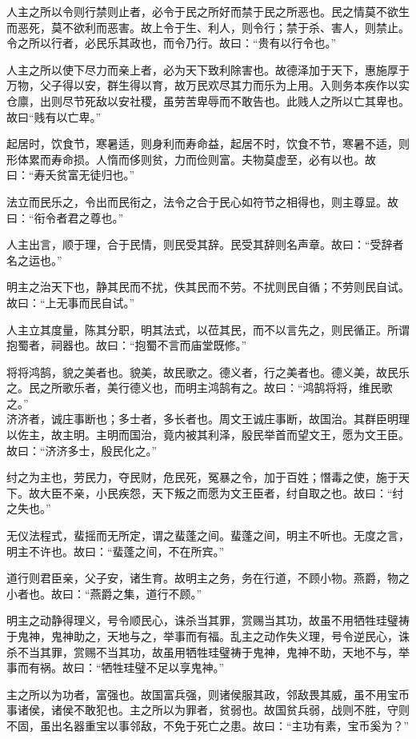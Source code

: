 \documentclass[]{article}
\begin{document}
人主之所以令则行禁则止者，必令于民之所好而禁于民之所恶也。民之情莫不欲生而恶死，莫不欲利而恶害。故上令于生、利人，则令行；禁于杀、害人，则禁止。令之所以行者，必民乐其政也，而令乃行。故曰：``贵有以行令也。''

人主之所以使下尽力而亲上者，必为天下致利除害也。故德泽加于天下，惠施厚于万物，父子得以安，群生得以育，故万民欢尽其力而乐为上用。入则务本疾作以实仓廪，出则尽节死敌以安社稷，虽劳苦卑辱而不敢告也。此贱人之所以亡其卑也。故曰``贱有以亡卑。''

起居时，饮食节，寒暑适，则身利而寿命益，起居不时，饮食不节，寒暑不适，则形体累而寿命损。人惰而侈则贫，力而俭则富。夫物莫虚至，必有以也。故曰：``寿夭贫富无徒归也。''

法立而民乐之，令出而民衔之，法令之合于民心如符节之相得也，则主尊显。故曰：``衔令者君之尊也。''

人主出言，顺于理，合于民情，则民受其辞。民受其辞则名声章。故曰：``受辞者名之运也。''

明主之治天下也，静其民而不扰，佚其民而不劳。不扰则民自循；不劳则民自试。故曰：``上无事而民自试。''

人主立其度量，陈其分职，明其法式，以莅其民，而不以言先之，则民循正。所谓抱蜀者，祠器也。故曰：``抱蜀不言而庙堂既修。''

将将鸿鹄，貌之美者也。貌美，故民歌之。德义者，行之美者也。德义美，故民乐之。民之所歌乐者，美行德义也，而明主鸿鹄有之。故曰：``鸿鹄将将，维民歌之。''\\
济济者，诚庄事断也；多士者，多长者也。周文王诚庄事断，故国治。其群臣明理以佐主，故主明。主明而国治，竟内被其利泽，殷民举首而望文王，愿为文王臣。故曰：``济济多士，殷民化之。''

纣之为主也，劳民力，夺民财，危民死，冤暴之令，加于百姓；憯毒之使，施于天下。故大臣不亲，小民疾怨，天下叛之而愿为文王臣者，纣自取之也。故曰：``纣之失也。''

无仪法程式，蜚摇而无所定，谓之蜚蓬之间。蜚蓬之间，明主不听也。无度之言，明主不许也。故曰：``蜚蓬之间，不在所宾。''

道行则君臣亲，父子安，诸生育。故明主之务，务在行道，不顾小物。燕爵，物之小者也。故曰：``燕爵之集，道行不顾。''

明主之动静得理义，号令顺民心，诛杀当其罪，赏赐当其功，故虽不用牺牲珪璧祷于鬼神，鬼神助之，天地与之，举事而有福。乱主之动作失义理，号令逆民心，诛杀不当其罪，赏赐不当其功，故虽用牺牲珪璧祷于鬼神，鬼神不助，天地不与，举事而有祸。故曰：``牺牲珪璧不足以享鬼神。''

主之所以为功者，富强也。故国富兵强，则诸侯服其政，邻敌畏其威，虽不用宝币事诸侯，诸侯不敢犯也。主之所以为罪者，贫弱也。故国贫兵弱，战则不胜，守则不固，虽出名器重宝以事邻敌，不免于死亡之患。故曰：``主功有素，宝币奚为？''
\end{document}
